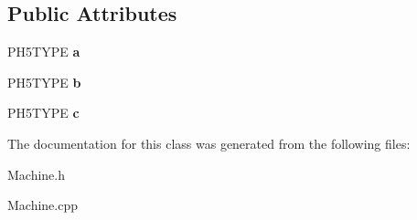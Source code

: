 \subsection*{Public Attributes}
\begin{DoxyCompactItemize}
\item 
\hypertarget{classfirestep_1_1_z_plane_acbd7fb27fe0c4545f8bd3a55f704faca}{P\+H5\+T\+Y\+P\+E {\bfseries a}}\label{classfirestep_1_1_z_plane_acbd7fb27fe0c4545f8bd3a55f704faca}

\item 
\hypertarget{classfirestep_1_1_z_plane_a0ea810f77f4fdc34fd4242be330cdfef}{P\+H5\+T\+Y\+P\+E {\bfseries b}}\label{classfirestep_1_1_z_plane_a0ea810f77f4fdc34fd4242be330cdfef}

\item 
\hypertarget{classfirestep_1_1_z_plane_a2a18af1a7c62c7113b72fa884750f388}{P\+H5\+T\+Y\+P\+E {\bfseries c}}\label{classfirestep_1_1_z_plane_a2a18af1a7c62c7113b72fa884750f388}

\end{DoxyCompactItemize}


The documentation for this class was generated from the following files\+:\begin{DoxyCompactItemize}
\item 
Machine.\+h\item 
Machine.\+cpp\end{DoxyCompactItemize}
